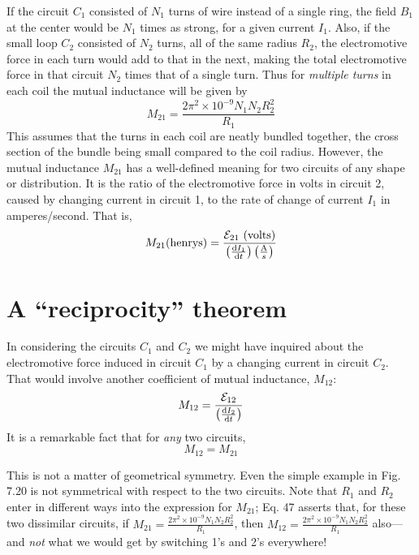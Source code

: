 If the circuit $C_1$ consisted of $N_1$ turns of wire instead of a single
ring, the field $B_1$ at the center would be $N_1$ times as strong, for a given
current $I_1$. Also, if the small loop $C_2$ consisted of $N_2$ turns, all of the
same radius $R_2$, the electromotive force in each turn would add to
that in the next, making the total electromotive force in that circuit
$N_2$ times that of a single turn. Thus for \emph{multiple turns} in each coil
the mutual inductance will be given by
\begin{equation}
  M_{21} = \frac{2\pi^2 \times 10^{-9}N_1N_2R_2^2}{R_1}
\end{equation}
This assumes that the turns in each coil are neatly bundled 
together, the cross section of the bundle being small compared to the
coil radius. However, the mutual inductance $M_{21}$ has a well-defined
meaning for two circuits of any shape or distribution. It is the ratio
of the electromotive force in volts in circuit 2, caused by changing
current in circuit 1, to the rate of change of current $I_1$ in amperes/second.
That is,
\begin{equation}
  M_{21}(\text{henrys})
        = \frac{\mathcal{E}_{21}\ (\text{volts})}{\left(\frac{\textup{d} I_1}{\textup{d} t}\right)\left(\frac{\text{A}}{s}\right)}
\end{equation}


\section{A ``reciprocity'' theorem}

In considering the circuits $C_1$ and $C_2$ we might have inquired about
the electromotive force induced in circuit $C_1$ by a changing current
in circuit $C_2$. That would involve another coefficient of mutual
inductance, $M_{12}$:
\begin{equation}
  M_{12} = \frac{\mathcal{E}_{12}}{\left(\frac{\textup{d} I_2}{\textup{d} t}\right)}
\end{equation}
It is a remarkable fact that for \emph{any} two circuits,
\begin{equation}
  M_{12}=M_{21}
\end{equation}

This is not a matter of geometrical symmetry. Even the simple
example in Fig. 7.20 is not symmetrical with respect to the two
circuits. Note that $R_1$ and $R_2$ enter in different ways into the expression
for $M_{21}$; Eq. 47 asserts that, for these two dissimilar circuits, if
$  M_{21} = \frac{2\pi^2 \times 10^{-9}N_1N_2R_2^2}{R_1}$, then
$  M_{12} = \frac{2\pi^2 \times 10^{-9}N_1N_2R_2^2}{R_1}$
also---and \emph{not} what we would get by switching 1's and 2's everywhere!

